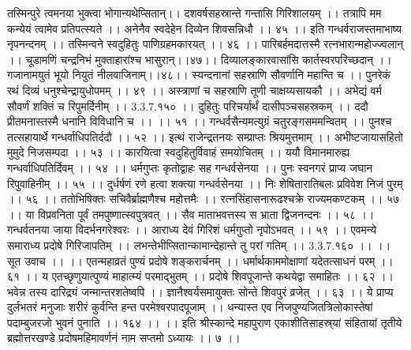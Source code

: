 तस्मिन्पुरे त्वमनया भुक्त्वा भोगान्यथेप्सितान्।।
दशवर्षसहस्रान्ते गन्तासि गिरिशालयम् ।।
तत्रापि मम कन्येयं त्वामेव प्रतिपत्स्यते ।।
अनेनैव स्वदेहेन दिव्येन शिवसन्निधौ ।। ४५ ।।
इति गन्धर्वराजस्तमाभाष्य नृपनन्दनम् ।।
तस्मिन्वने स्वदुहितुः पाणिग्रहमकारयत् ।। ४६ ।।
पारिबर्हमदात्तस्मै रत्नभारान्महोज्ज्वलान् ।।
चूडामणिं चन्द्रनिभं मुक्ताहारांश्च भासुरान्।।४७।।
दिव्यालङ्कारवासांसि कार्तस्वरपरिच्छदान् ।।
गजानामयुतं भूयो नियुतं नीलवाजिनाम्।।४८।।
स्यन्दनानां सहस्राणि सौवर्णानि महान्ति च ।।
पुनरेकं रथं दिव्यं धनुश्चेन्द्रायुधोपमम् ।। ४९ ।।
अस्त्राणां च सहस्राणि तूणी चाक्षय्यसायकौ ।।
अभेद्यं वर्म सौवर्णं शक्तिं च रिपुमर्दिनीम् ।। 3.3.7.१५० ।।
दुहितुः परिचर्यार्थं दासीपञ्चसहस्रकम् ।।
ददौ प्रीतमनास्तस्मै धनानि विविधानि च ।। ।। ५१ ।।
गन्धर्वसैन्यमत्युग्रं चतुरङ्गसममन्वितम् ।।
पुनश्च तत्सहायार्थे गन्धर्वाधिपतिर्ददौ ।। ५२ ।।
इत्थं राजेन्द्रतनयः सम्प्राप्तः श्रियमुत्तमाम् ।।
अभीष्टजायासहितो मुमुदे निजसम्पदा ।। ५३ ।।
कारयित्वा स्वदुहितुर्विवाहं समयोचितम् ।।
ययौ विमानमारुह्य गन्धर्वाधिपतिर्दिवम् ।। ५४ ।।
धर्मगुप्तः कृतोद्वाहः सह गन्धर्वसेनया ।।
पुनः स्वनगरं प्राप्य जघान रिपुवाहिनीम् ।। ५५ ।।
दुर्धर्षणं रणे हत्वा शक्त्या गन्धर्वसेनया ।।
निः शेषितारातिबलः प्रविवेश निजं पुरम् ।। ५६ ।।
ततोभिषिक्तः सचिवैर्ब्राह्मणैश्च महोत्तमैः ।।
रत्नसिंहासनारूढश्चक्रे राज्यमकण्टकम् ।। ५७ ।।
या विप्रवनिता पूर्वं तमपुष्णात्स्वपुत्रवत् ।।
सैव माताभवत्तस्य स भ्राता द्विजनन्दनः ।। ५८ ।।
गन्धर्वतनया जाया विदर्भनगरेश्वरः ।।
आराध्य देवं गिरिशं धर्मगुप्तो नृपोऽभवत् ।। ५९ ।।
एवमन्ये समाराध्य प्रदोषे गिरिजापतिम् ।।
लभन्तेभीप्सितान्कामान्देहान्ते तु परां गतिम् ।। 3.3.7.१६० ।।
।। सूत उवाच ।। ।।
एतन्महाव्रतं पुण्यं प्रदोषे शङ्करार्चनम् ।।
धर्मार्थकाममोक्षाणां यदेतत्साधनं परम् ।। ६१ ।।
य एतच्छृणुयात्पुण्यं माहात्म्यं परमाद्भुतम् ।।
प्रदोषे शिवपूजान्ते कथयेद्वा समाहितः ।। ६२ ।।
भवेन्न तस्य दारिद्र्यं जन्मान्तरशतेष्वपि ।।
ज्ञानैश्वर्यसमायुक्तः सोन्ते शिवपुरं व्रजेत् ।। ६३ ।।
ये प्राप्य दुर्लभतरं मनुजाः शरीरं कुर्वन्ति हन्त परमेश्वरपादपूजाम् ।।
धन्यास्त एव निजपुण्यजितत्रिलोकास्तेषां पदाम्बुजरजो भुवनं पुनाति ।। १६४ ।। ।।
इति श्रीस्कान्दे महापुराण एकाशीतिसाहस्र्यां संहितायां तृतीये ब्रह्मोत्तरखण्डे प्रदोषमहिमावर्णनं नाम सप्तमो ऽध्यायः ।। ७ ।।
